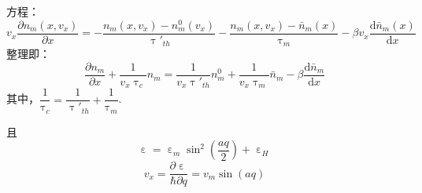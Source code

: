 \documentclass{article}
\begin{document}
	\noindent 方程：
	\begin{equation}\label{eq:1}
		v_x\frac{\partial n_m(x,v_x)}{\partial x}=-\frac{n_m(x,v_x)-n_m^0(v_x)}{\uptau'_{th}}-\frac{n_m(x,v_x)-\bar{n}_m(x)}{\uptau_m}-\beta v_x\frac{\mathrm{d}\bar{n}_m(x)}{\mathrm{d}x}
	\end{equation}
	整理即：
	\begin{equation}\label{eq:2}
		\frac{\partial n_m}{\partial x}+\frac{1}{v_x\uptau_c}n_m=\frac{1}{v_x\uptau'_{th}}n_m^0+\frac{1}{v_x\uptau_m}\bar{n}_m-\beta\frac{\mathrm{d}\bar{n}_m}{\mathrm{d}x}
	\end{equation}
	其中，$\dfrac{1}{\uptau_c}=\dfrac{1}{\uptau'_{th}}+\dfrac{1}{\uptau_m}$.
	
	\noindent 且
	\[\upepsilon=\upepsilon_m\sin^2(\frac{aq}{2})+\upepsilon_H\]
	\[v_x=\frac{\partial\upepsilon}{\hbar\partial q}=v_m\sin(aq)\]
	
\end{document}
